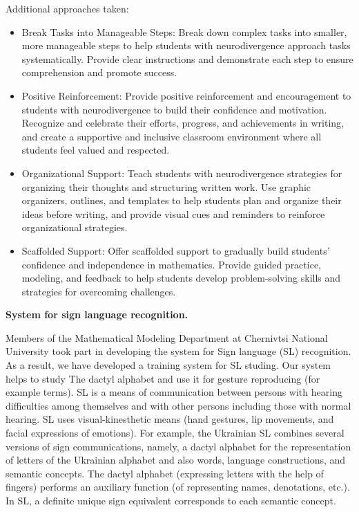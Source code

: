\documentclass[a4paper,12pt]{article}
\begin{document}
\begin{large}
\begin{itemize}
\end{itemize}

Additional approaches taken:

\begin{itemize}
    
\item Break Tasks into Manageable Steps: Break down complex tasks into smaller, more manageable steps to help students with neurodivergence approach tasks systematically. Provide clear instructions and demonstrate each step to ensure comprehension and promote success.
    
\item Positive Reinforcement: Provide positive reinforcement and encouragement to students with neurodivergence to build their confidence and motivation. Recognize and celebrate their efforts, progress, and achievements in writing, and create a supportive and inclusive classroom environment where all students feel valued and respected.
    
\item Organizational Support: Teach students with neurodivergence strategies for organizing their thoughts and structuring written work. Use graphic organizers, outlines, and templates to help students plan and organize their ideas before writing, and provide visual cues and reminders to reinforce organizational strategies.
    
\item Scaffolded Support: Offer scaffolded support to gradually build students' confidence and independence in mathematics. Provide guided practice, modeling, and feedback to help students develop problem-solving skills and strategies for overcoming challenges.
\end{itemize}

\textbf{System for sign language recognition.}

Members of the Mathematical Modeling Department at Chernivtsi National University took part in developing the system for  Sign language (SL) recognition. As a result, we have developed a training system for SL studing. Our system helps to study The dactyl alphabet and use it for gesture reproducing (for example terms).
SL  is a means of communication between persons with hearing difficulties among themselves and with other persons including those with normal hearing. SL uses visual-kinesthetic means (hand gestures, lip movements, and facial expressions of emotions). For example, the Ukrainian SL combines several versions of sign communications, namely, a dactyl alphabet for the representation of letters of the Ukrainian alphabet and also words, language constructions, and semantic concepts. The dactyl alphabet (expressing letters with the help of fingers) performs an auxiliary function (of representing names, denotations, etc.). In SL, a definite unique sign equivalent corresponds to each semantic concept.


\end{large}
\end{document}
